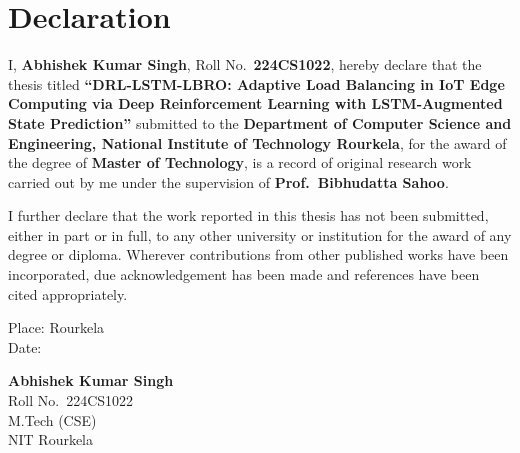 \chapter*{Declaration}
\thispagestyle{plain}

I, \textbf{Abhishek Kumar Singh}, Roll No.\ \textbf{224CS1022},
hereby declare that the thesis titled \textbf{``DRL-LSTM-LBRO:
Adaptive Load Balancing in IoT Edge Computing via Deep Reinforcement
Learning with LSTM-Augmented State Prediction''} submitted to the
\textbf{Department of Computer Science and Engineering, National
Institute of Technology Rourkela}, for the award of the degree of
\textbf{Master of Technology}, is a record of original research work
carried out by me under the supervision of
\textbf{Prof.\ Bibhudatta Sahoo}.

I further declare that the work reported in this thesis has not been
submitted, either in part or in full, to any other university or
institution for the award of any degree or diploma. Wherever
contributions from other published works have been incorporated, due
acknowledgement has been made and references have been cited
appropriately.

\vspace{3.0cm}

\noindent
\begin{minipage}[t]{0.55\textwidth}
Place: Rourkela\\
Date: \underline{\hspace{3cm}}
\end{minipage}
\hfill
\begin{minipage}[t]{0.40\textwidth}
\textbf{Abhishek Kumar Singh}\\
Roll No.\ 224CS1022\\
M.Tech (CSE)\\
NIT Rourkela
\end{minipage}
